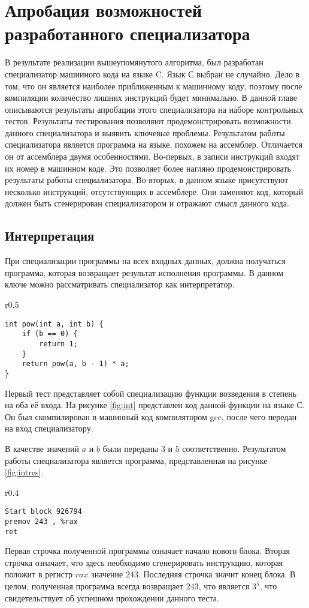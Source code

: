 \section{Апробация возможностей разработанного специализатора}
В результате реализации вышеупомянутого алгоритма, был разработан специализатор машииного кода на языке C. Язык С выбран не случайно. Дело в том, что он является наиболее приближенным к машинному коду, поэтому после компиляции количество лишних инструкций будет минимально. В данной главе описываются результаты апробации этого специализатора на наборе контрольных тестов. Результаты тестирования позволяют продемонстрировать возможности данного специализатора и выявить ключевые проблемы.
Результатом работы специализатора является программа на языке, похожем на ассемблер. Отличается он от ассемблера двумя особенностями. Во-первых, в записи инструкций входят их номер в машинном коде. Это позволяет более нагляно продемонстрировать результаты работы специализатора. Во-вторых, в данном языке присутствуют несколько инструкций, отсутствующих в ассемблере. Они заменяют код, который должен быть сгенерирован специализатором и отражают смысл данного кода.

\subsection{ Интерпретация}
При специализации программы на всех входных данных, должна получаться программа, которая возвращает результат исполнения программы. В данном ключе можно рассматривать специализатор как интерпретатор.
\begin{wrapfigure}{r}{0.5\textwidth}
\begin{lstlisting}[xleftmargin = 20pt]
int pow(int a, int b) {
    if (b == 0) {
        return 1;
    }
    return pow(a, b - 1) * a;
}
\end{lstlisting}
\caption{ Функция возведения в степень}
\label{fig:int}
\end{wrapfigure}
Первый тест представляет собой специализацию функции возведения в степень на оба её входа. На рисунке \ref{fig:int} представлен код данной функции на языке С. Он был скомпилирован в машинный код компилятором gcc, после чего передан на вход специализатору.

В качестве значений $a$ и $b$ были переданы $3$ и $5$ соответственно. Результатом работы специализатора является программа, представленная на рисунке \ref{fig:intres}.
\begin{wrapfigure}{r}{0.4\textwidth}
\begin{lstlisting}[xleftmargin = 20pt]
Start block 926794
premov 243 , %rax 
ret
\end{lstlisting}
\caption{ Результат специализации}
\label{fig:intres}
\end{wrapfigure}
Первая строчка полученной программы означает начало нового блока. Вторая строчка означает, что здесь необходимо сгенерировать инструкцию, которая положит в регистр $rax$ значение $243$. Последняя строчка значит конец блока. В целом, полученная программа всегда возвращает $243$, что является $3^5$, что свидетельствует об успешном прохождении данного теста. 

